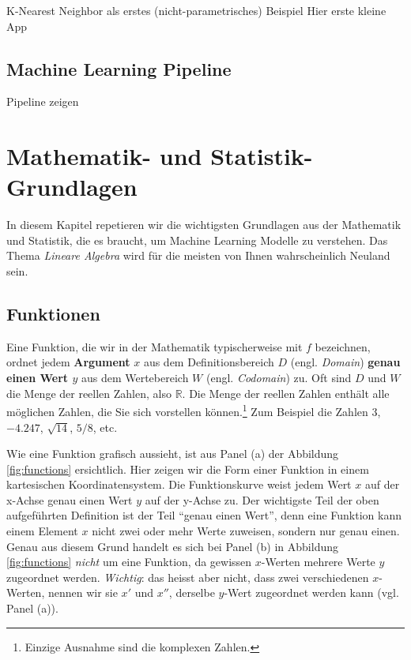 \documentclass[
]{book}
\begin{document}
K-Nearest Neighbor als erstes (nicht-parametrisches) Beispiel
Hier erste kleine App

\hypertarget{machine-learning-pipeline}{%
\section{Machine Learning Pipeline}\label{machine-learning-pipeline}}

Pipeline zeigen

\hypertarget{basics}{%
\chapter{Mathematik- und Statistik-Grundlagen}\label{basics}}

In diesem Kapitel repetieren wir die wichtigsten Grundlagen aus der Mathematik und Statistik, die es braucht, um Machine Learning Modelle zu verstehen. Das Thema \emph{Lineare Algebra} wird für die meisten von Ihnen wahrscheinlich Neuland sein.

\hypertarget{funktionen}{%
\section{Funktionen}\label{funktionen}}

Eine Funktion, die wir in der Mathematik typischerweise mit \(f\) bezeichnen, ordnet jedem \textbf{Argument} \(x\) aus dem Definitionsbereich \(D\) (engl. \emph{Domain}) \textbf{genau einen Wert \(y\)} aus dem Wertebereich \(W\) (engl. \emph{Codomain}) zu. Oft sind \(D\) und \(W\) die Menge der reellen Zahlen, also \(\mathbb{R}\). Die Menge der reellen Zahlen enthält alle möglichen Zahlen, die Sie sich vorstellen können.\footnote{Einzige Ausnahme sind die komplexen Zahlen.} Zum Beispiel die Zahlen \(3\), \(-4.247\), \(\sqrt{14}\), \(5/8\), etc.

Wie eine Funktion grafisch aussieht, ist aus Panel (a) der Abbildung \ref{fig:functions} ersichtlich. Hier zeigen wir die Form einer Funktion in einem kartesischen Koordinatensystem. Die Funktionskurve weist jedem Wert \(x\) auf der x-Achse genau einen Wert \(y\) auf der y-Achse zu. Der wichtigste Teil der oben aufgeführten Definition ist der Teil ``genau einen Wert'', denn eine Funktion kann einem Element \(x\) nicht zwei oder mehr Werte zuweisen, sondern nur genau einen. Genau aus diesem Grund handelt es sich bei Panel (b) in Abbildung \ref{fig:functions} \emph{nicht} um eine Funktion, da gewissen \(x\)-Werten mehrere Werte \(y\) zugeordnet werden. \emph{Wichtig}: das heisst aber nicht, dass zwei verschiedenen \(x\)-Werten, nennen wir sie \(x'\) und \(x''\), derselbe \(y\)-Wert zugeordnet werden kann (vgl. Panel (a)).
\end{document}
